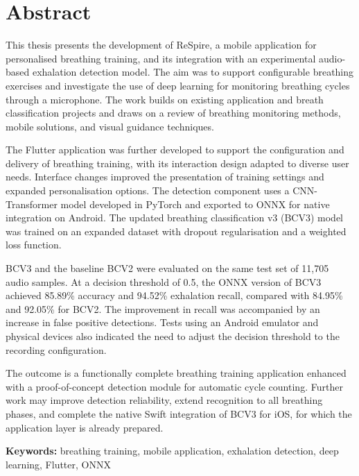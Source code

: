 \chapter*{Abstract}

\indent This thesis presents the development of ReSpire, a mobile application for personalised breathing training, and its integration with an experimental audio-based exhalation detection model. The aim was to support configurable breathing exercises and investigate the use of deep learning for monitoring breathing cycles through a microphone. The work builds on existing application and breath classification projects and draws on a review of breathing monitoring methods, mobile solutions, and visual guidance techniques.

The Flutter application was further developed to support the configuration and delivery of breathing training, with its interaction design adapted to diverse user needs. Interface changes improved the presentation of training settings and expanded personalisation options. The detection component uses a CNN-Transformer model developed in PyTorch and exported to ONNX for native integration on Android. The updated breathing classification v3 (BCV3) model was trained on an expanded dataset with dropout regularisation and a weighted loss function.

BCV3 and the baseline BCV2 were evaluated on the same test set of 11,705 audio samples. At a decision threshold of 0.5, the ONNX version of BCV3 achieved 85.89\% accuracy and 94.52\% exhalation recall, compared with 84.95\% and 92.05\% for BCV2. The improvement in recall was accompanied by an increase in false positive detections. Tests using an Android emulator and physical devices also indicated the need to adjust the decision threshold to the recording configuration.

The outcome is a functionally complete breathing training application enhanced with a proof-of-concept detection module for automatic cycle counting. Further work may improve detection reliability, extend recognition to all breathing phases, and complete the native Swift integration of BCV3 for iOS, for which the application layer is already prepared.

\vspace{0.5cm}
\noindent\textbf{Keywords:} breathing training, mobile application, exhalation detection, deep learning, Flutter, ONNX \vspace{0.5cm}
